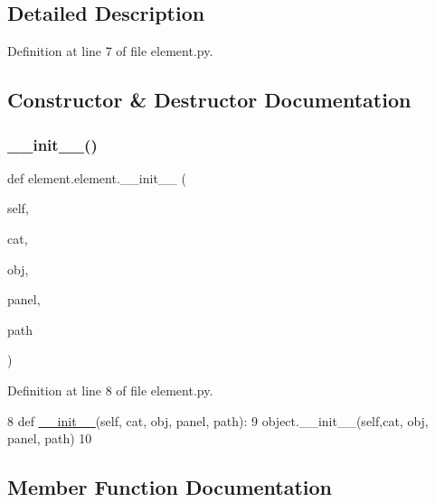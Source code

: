 \subsection{Detailed Description}


Definition at line 7 of file element.\+py.



\subsection{Constructor \& Destructor Documentation}
\mbox{\label{classelement_1_1element_a72de0f0e7b950dabca314ed77552cb90}} 
\subsubsection{\texorpdfstring{\+\_\+\+\_\+init\+\_\+\+\_\+()}{\_\_init\_\_()}}
{\footnotesize\ttfamily def element.\+element.\+\_\+\+\_\+init\+\_\+\+\_\+ (\begin{DoxyParamCaption}\item[{}]{self,  }\item[{}]{cat,  }\item[{}]{obj,  }\item[{}]{panel,  }\item[{}]{path }\end{DoxyParamCaption})}



Definition at line 8 of file element.\+py.


\begin{DoxyCode}
8     \textcolor{keyword}{def }\hyperlink{classwrapper_1_1ModuleDictWrapper_a9a7a794150502f51df687831583e13b9}{\_\_init\_\_}(self, cat, obj, panel, path):
9         object.\_\_init\_\_(self,cat, obj, panel, path)
10 
\end{DoxyCode}


\subsection{Member Function Documentation}
\mbox{\label{classobject_1_1object_a54a55487254a96ed2fe367439c41391f}} 
